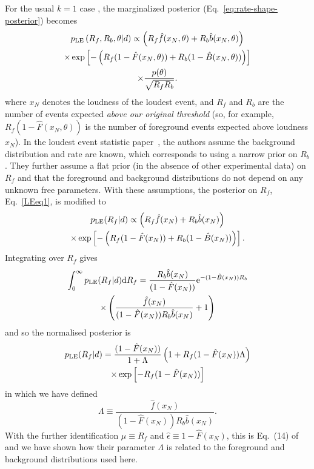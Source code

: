 \documentclass[aps,prd,reprint,nofootinbib]{revtex4-1}
\begin{document}
For the usual $k=1$ case \citep{Biswas2009}, the marginalized
posterior (Eq.~\eqref{eq:rate-shape-posterior}) becomes
\begin{multline}\label{LEeq1}
p_{\rm LE}\left( R_f, R_b, \theta | d \right) \propto \left(R_f
\hat{f}(x_N,\theta) + R_b \hat{b}(x_N,\theta)\right) \\ \times \exp\left[-\left(
  R_f (1-\hat{F}(x_N,\theta)) + R_b (1-\hat{B}(x_N,\theta)) \right)
  \right] \\ \times \frac{p(\theta)}{\sqrt{R_f R_b}}.
\end{multline}
where $x_N$ denotes the loudness of the loudest event, and $R_f$ and
$R_b$ are the number of events expected \emph{above our original
  threshold} (so, for example, $R_f (1 - \hat{F}(x_N,\theta))$ is the
number of foreground events expected above loudness $x_N$).  In the
loudest event statistic paper~\citep{Biswas2009}, the authors assume
the background distribution and rate are known, which corresponds to
using a narrow prior on $R_b$. They further assume a flat prior (in
the absence of other experimental data) on $R_f$ and that the
foreground and background distributions do not depend on any unknown
free parameters. With these assumptions, the posterior on $R_f$,
Eq.~\eqref{LEeq1}, is modified to
\begin{multline}
p_{\rm LE}(R_f|d) \propto  \left(R_f
\hat{f}(x_N) + R_b \hat{b}(x_N)\right) \\ \times \exp\left[-\left(
  R_f (1-\hat{F}(x_N)) + R_b (1-\hat{B}(x_N)) \right)
  \right] .
\end{multline}
Integrating over $R_f$ gives
\begin{multline}
\int_0^\infty p_{\rm LE}(R_f|d) {\rm d}R_f =  \frac{R_b \hat{b}(x_N)}{(1-\hat{F}(x_N))} {\rm e}^{-(1-\hat{B}(x_N)) R_b}\\
\times \left(\frac{\hat{f}(x_N)}{(1-\hat{F}(x_N)) R_b \hat{b}(x_N)} + 1 \right)
\end{multline}
and so the normalised posterior is
\begin{multline}
p_{\rm LE}(R_f|d) = \frac{(1-\hat{F}(x_N))}{1+\Lambda} \left( 1+ R_f (1-\hat{F}(x_N))\Lambda \right) \\
\times \exp\left[-R_f (1-\hat{F}(x_N))\right]
\label{loudest-eq}
\end{multline}
in which we have defined
\begin{equation}
\Lambda \equiv \frac{\hat{f}(x_N)}{(1-\hat{F}(x_N)) R_b \hat{b}(x_N)}.
\end{equation}
With the further identification $\mu \equiv R_f$ and $\hat{\epsilon} \equiv 1 - \hat{F}(x_N)$, this is Eq.~(14) of~\citep{Biswas2009} and we have shown how their parameter $\Lambda$ is related to the foreground and background distributions used here.
\end{document}
